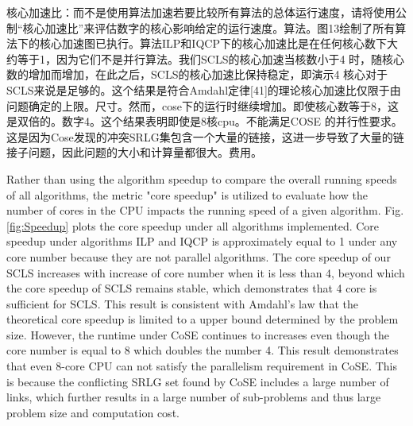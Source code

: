 核心加速比：而不是使用算法加速若要比较所有算法的总体运行速度，请将使用公制“核心加速比”来评估数字的核心影响给定的运行速度。算法。图13绘制了所有算法下的核心加速图已执行。算法ILP和IQCP下的核心加速比是在任何核心数下大约等于1，因为它们不是并行算法。我们SCLS的核心加速当核数小于4 时，随核心数的增加而增加，在此之后，SCLS的核心加速比保持稳定，即演示4 核心对于SCLS来说是足够的。这个结果是符合Amdahl定律[41]的理论核心加速比仅限于由问题确定的上限。尺寸。然而，cose下的运行时继续增加。即使核心数等于8，这是双倍的。数字4。这个结果表明即使是8核cpu。不能满足COSE 的并行性要求。这是因为Cose发现的冲突SRLG集包含一个大量的链接，这进一步导致了大量的链接子问题，因此问题的大小和计算量都很大。费用。


Rather than using the algorithm speedup to compare the overall running speeds of all algorithms, the metric "core speedup" is utilized to evaluate how the number of cores in the CPU impacts the running speed of a given algorithm.
Fig.\ref{fig:Speedup} plots the core speedup under all algorithms implemented.
Core speedup under algorithms ILP and IQCP is  approximately equal to 1 under any core number because they are not parallel algorithms. The core speedup of our SCLS increases with increase of core number when it is less than 4, beyond which the core speedup of SCLS remains stable, which demonstrates that 4 core is sufficient for SCLS. This result is consistent with Amdahl's law\cite{amdahl1967validity} that the theoretical core speedup is limited to a upper bound determined by the problem size. However, the runtime under CoSE continues to increases even though the core number is  equal to 8 which doubles the number 4. This result demonstrates that even 8-core CPU can not satisfy the parallelism requirement in CoSE. This is because the conflicting SRLG set found by CoSE includes  a large number of links,  which further results in a large number of sub-problems  and thus large problem size and  computation cost.


%

